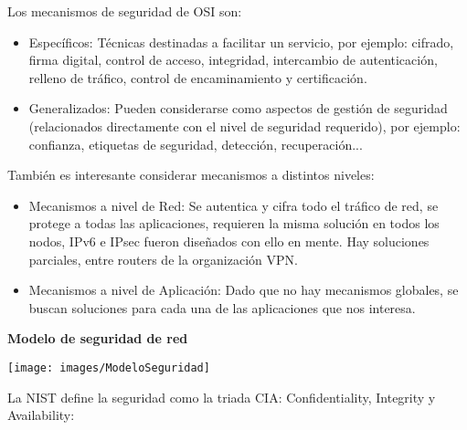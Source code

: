 \documentclass[10pt,portrait, twocolumn]{article}
\begin{document}
Los mecanismos de seguridad de OSI son:

	\begin{itemize}
		\item Específicos: Técnicas destinadas a facilitar un servicio, por ejemplo: cifrado, firma digital, control de acceso, integridad, intercambio de autenticación, relleno de tráfico, control de encaminamiento y certificación.
		\item Generalizados: Pueden considerarse como aspectos de gestión de seguridad (relacionados directamente con el nivel de seguridad requerido), por ejemplo: confianza, etiquetas de seguridad, detección, recuperación...
	\end{itemize}
	
También es interesante considerar mecanismos a distintos niveles:

	\begin{itemize}
		\item Mecanismos a nivel de Red: Se autentica y cifra todo el tráfico de red, se protege a todas las aplicaciones, requieren la misma solución en todos los nodos, IPv6 e IPsec fueron diseñados con ello en mente. Hay soluciones parciales, entre routers de la organización VPN.
		\item Mecanismos a nivel de Aplicación: Dado que no hay mecanismos globales, se buscan soluciones para cada una de las aplicaciones que nos interesa.
	\end{itemize}
	
\textbf{Modelo de seguridad de red}

\begin{center}
	\texttt{[image: images/ModeloSeguridad]}
\end{center}

La NIST define la seguridad como la triada CIA: Confidentiality, Integrity y Availability:
\end{document}
